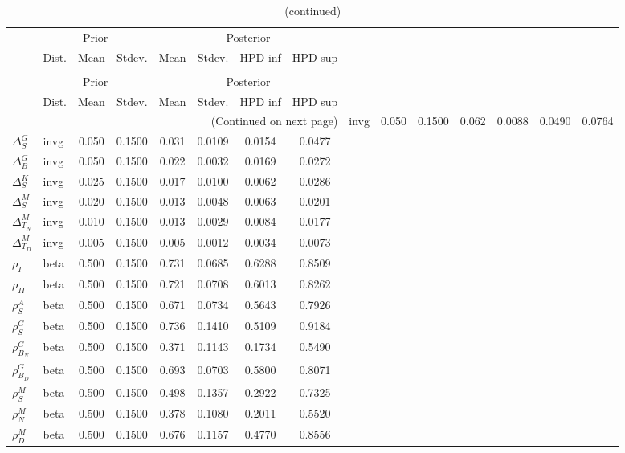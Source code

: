 
\begin{center}
\begin{longtable}{llcccccc} 
\caption{Results from Metropolis-Hastings (parameters)}
 \label{Table:MHPosterior:1}\\
\toprule 
  & \multicolumn{3}{c}{Prior}  &  \multicolumn{4}{c}{Posterior} \\
  \cmidrule(r{.75em}){2-4} \cmidrule(r{.75em}){5-8}
  & Dist. & Mean  & Stdev. & Mean & Stdev. & HPD inf & HPD sup\\
\midrule \endfirsthead 
\caption{(continued)}\\\toprule 
  & \multicolumn{3}{c}{Prior}  &  \multicolumn{4}{c}{Posterior} \\
  \cmidrule(r{.75em}){2-4} \cmidrule(r{.75em}){5-8}
  & Dist. & Mean  & Stdev. & Mean & Stdev. & HPD inf & HPD sup\\
\midrule \endhead 
\bottomrule \multicolumn{8}{r}{(Continued on next page)} \endfoot 
\bottomrule \endlastfoot 
${\Delta^{A}_{S}}$ & invg &   0.050 & 0.1500 &   0.062& 0.0088 &  0.0490 &  0.0764 \\ 
${\Delta^{G}_{S}}$ & invg &   0.050 & 0.1500 &   0.031& 0.0109 &  0.0154 &  0.0477 \\ 
${\Delta^{G}_{B}}$ & invg &   0.050 & 0.1500 &   0.022& 0.0032 &  0.0169 &  0.0272 \\ 
${\Delta^{K}_{S}}$ & invg &   0.025 & 0.1500 &   0.017& 0.0100 &  0.0062 &  0.0286 \\ 
${\Delta^{M}_{S}}$ & invg &   0.020 & 0.1500 &   0.013& 0.0048 &  0.0063 &  0.0201 \\ 
${\Delta^{M}_{T_N}}$ & invg &   0.010 & 0.1500 &   0.013& 0.0029 &  0.0084 &  0.0177 \\ 
${\Delta^{M}_{T_D}}$ & invg &   0.005 & 0.1500 &   0.005& 0.0012 &  0.0034 &  0.0073 \\ 
${\rho_{I}}$ & beta &   0.500 & 0.1500 &   0.731& 0.0685 &  0.6288 &  0.8509 \\ 
${\rho_{II}}$ & beta &   0.500 & 0.1500 &   0.721& 0.0708 &  0.6013 &  0.8262 \\ 
${\rho^{A}_{S}}$ & beta &   0.500 & 0.1500 &   0.671& 0.0734 &  0.5643 &  0.7926 \\ 
${\rho^{G}_{S}}$ & beta &   0.500 & 0.1500 &   0.736& 0.1410 &  0.5109 &  0.9184 \\ 
${\rho^{G}_{B_N}}$ & beta &   0.500 & 0.1500 &   0.371& 0.1143 &  0.1734 &  0.5490 \\ 
${\rho^{G}_{B_D}}$ & beta &   0.500 & 0.1500 &   0.693& 0.0703 &  0.5800 &  0.8071 \\ 
${\rho^{M}_{S}}$ & beta &   0.500 & 0.1500 &   0.498& 0.1357 &  0.2922 &  0.7325 \\ 
${\rho^{M}_{N}}$ & beta &   0.500 & 0.1500 &   0.378& 0.1080 &  0.2011 &  0.5520 \\ 
${\rho^{M}_{D}}$ & beta &   0.500 & 0.1500 &   0.676& 0.1157 &  0.4770 &  0.8556 \\ 
\end{longtable}
 \end{center}
